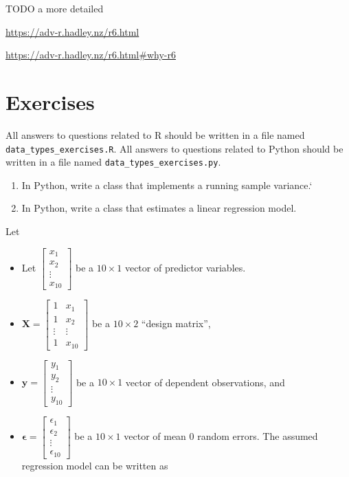 \documentclass[
  12pt,
]{krantz}
\providecommand{\tightlist}{%
  \setlength{\itemsep}{0pt}\setlength{\parskip}{0pt}}
\begin{document}
TODO
a more detailed

\url{https://adv-r.hadley.nz/r6.html}

\url{https://adv-r.hadley.nz/r6.html\#why-r6}

\hypertarget{exercises-6}{%
\section{Exercises}\label{exercises-6}}

All answers to questions related to R should be written in a file named \texttt{data\_types\_exercises.R}. All answers to questions related to Python should be written in a file named \texttt{data\_types\_exercises.py}.

\begin{enumerate}
\def\labelenumi{\arabic{enumi}.}
\item
  In Python, write a class that implements a running sample variance.`
\item
  In Python, write a class that estimates a linear regression model.
\end{enumerate}

Let

\begin{itemize}
\tightlist
\item
  Let \(\begin{bmatrix}x_1 \\ x_2 \\ \vdots \\ x_{10} \end{bmatrix}\) be a \(10 \times 1\) vector of predictor variables.
\item
  \(\mathbf{X} = \begin{bmatrix} 1 & x_1 \\ 1 & x_2 \\ \vdots & \vdots \\ 1 & x_{10} \end{bmatrix}\) be a \(10 \times 2\) ``design matrix'',
\item
  \(\mathbf{y} = \begin{bmatrix} y_1 \\ y_2 \\ \vdots \\ y_{10} \end{bmatrix}\) be a \(10 \times 1\) vector of dependent observations, and
\item
  \(\boldsymbol{\epsilon} = \begin{bmatrix} \epsilon_1 \\ \epsilon_2 \\ \vdots \\ \epsilon_{10} \end{bmatrix}\) be a \(10 \times 1\) vector of mean \(0\) random errors. The assumed regression model can be written as
\end{itemize}
\end{document}
